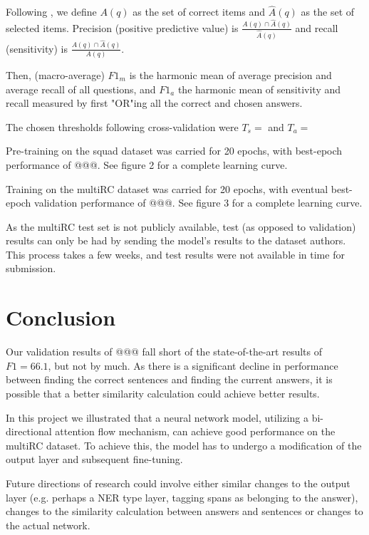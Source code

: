 \documentclass[12pt, a4paper]{article}
\begin{document}
\begin{multicols}{2}
			Following \cite{Rajpurkar2018} , we define $ A(q) $ as the set of correct items and $ \hat{A}(q) $ as the set of selected items. Precision (positive predictive value) is $ \frac{A(q) \cap \hat{A}(q)}{\hat{A}(q)} $ and recall (sensitivity) is $ \frac{A(q) \cap \hat{A}(q)}{A(q)} $.
			
			Then, (macro-average) $ F1_m $ is the harmonic mean of average precision and average recall of all questions, and $ F1_a $ the harmonic mean of sensitivity and recall measured by first "OR"ing all the correct and chosen answers.
			
			The chosen thresholds following cross-validation were $ T_s =  $ and $ T_a = $
		
			Pre-training on the squad dataset was carried for 20 epochs, with best-epoch performance of @@@. See figure 2 for a complete learning curve.
			
			Training on the multiRC dataset was carried for 20 epochs, with eventual best-epoch validation performance of @@@. See figure 3 for a complete learning curve.
			
			As the multiRC test set is not publicly available, test (as opposed to validation) results can only be had by sending the model's results to the dataset authors. This process takes a few weeks, and test results were not available in time for submission.
			
		\section{Conclusion}
		
			Our validation results of @@@ fall short of the state-of-the-art results of $ F1 = 66.1 $, but not by much. As there is a significant decline in performance between finding the correct sentences and finding the current answers, it is possible that a better similarity calculation could achieve better results.
		
			In this project we illustrated that a neural network model, utilizing a bi-directional attention flow mechanism, can achieve good performance on the multiRC dataset. To achieve this, the model has to undergo a modification of the output layer and subsequent fine-tuning.
			
			Future directions of research could involve either similar changes to the output layer (e.g. perhaps a NER type layer, tagging spans as belonging to the answer), changes to the similarity calculation between answers and sentences or changes to the actual network.
		
	\end{multicols}
\end{document}
